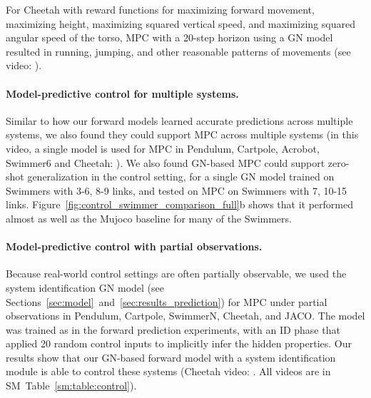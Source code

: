 \documentclass{article}
\begin{document}
For Cheetah with reward functions for maximizing forward movement, maximizing height, maximizing squared vertical speed, and maximizing squared angular speed of the torso, MPC with a 20-step horizon using a GN model resulted in running, jumping, and other reasonable patterns of movements (see video: \href{\controlcheetahmultiplerewards}{\controlcheetahmultiplerewardsname}).



\paragraph{Model-predictive control for multiple systems.}
Similar to how our forward models learned accurate predictions across multiple systems, we also found they could support MPC across multiple systems (in this video, a single model is used for MPC in Pendulum, Cartpole, Acrobot, Swimmer6 and Cheetah: \href{\controlmultiplesystems}{\controlmultiplesystemsname}).
%
We also found GN-based MPC could support zero-shot generalization in the control setting, for a single GN model trained on Swimmers with 3-6, 8-9 links, and tested on MPC on Swimmers with 7, 10-15 links. Figure~\ref{fig:control_swimmer_comparison_full}b shows that it performed almost as well as the Mujoco baseline for many of the Swimmers.


\paragraph{Model-predictive control with partial observations.}
Because real-world control settings are often partially observable, we used the system identification GN model (see Sections~\ref{sec:model}~and~\ref{sec:results_prediction}) for MPC under partial observations in Pendulum, Cartpole, SwimmerN, Cheetah, and JACO. The model was trained as in the forward prediction experiments, with an ID phase that applied 20 random control inputs to implicitly infer the hidden properties. Our results show that our GN-based forward model with a system identification module is able to control these systems (Cheetah video: \href{\controlidentifiedcheetah}{\controlidentifiedcheetahname}. All videos are in SM~Table~\ref{sm:table:control}).
\end{document}
